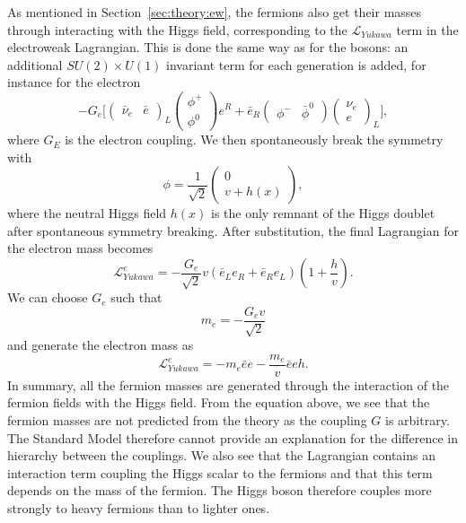 As mentioned in Section~\ref{sec:theory:ew}, the fermions also get their masses through interacting with the Higgs field, corresponding to the $\mathcal{L}_{Yukawa}$ term in the electroweak Lagrangian. This is done the same way as for the bosons: an additional $SU(2) \times U(1)$ invariant term for each generation is added, for instance for the electron
\begin{equation}
  -G_e \bigg[ \begin{pmatrix} \bar{\nu}_e & \bar{e}\end{pmatrix}_L   \begin{pmatrix} \phi^{+} \\ \phi^{0} \end{pmatrix} e^R +
  \bar{e}_R  \begin{pmatrix} \phi^{-} & \bar{\phi}^{0} \end{pmatrix}  \begin{pmatrix} \nu_e \\ e\end{pmatrix}_L  \bigg],
  \end{equation}
where $G_E$ is the electron coupling. We then spontaneously break the symmetry with
\begin{equation}
\phi = \frac{1}{\sqrt{2}}  \begin{pmatrix} 0 \\ v+h(x) \end{pmatrix},
\end{equation}
 where the neutral Higgs field $h(x)$ is the only remnant of the Higgs doublet after spontaneous symmetry breaking. After substitution, the final Lagrangian for the electron mass becomes
 \begin{equation}
   \mathcal{L}_{Yukawa}^e=-\frac{G_e}{\sqrt{2}}v(\bar{e}_L e_R + \bar{e}_R e_L )(1+\frac{h}{v}).
\end{equation}
We can choose $G_e$ such that
\begin{equation}
  m_e=-\frac{G_e v}{\sqrt{2}}
  \end{equation}
and generate the electron mass as
\begin{equation}
  \mathcal{L}_{Yukawa}^e=-m_e \bar{e}e-\frac{m_e}{v} \bar{e}eh.
\end{equation}  
In summary, all the fermion masses are generated through the interaction of the fermion fields with the Higgs field. From the equation above, we see that the fermion masses are not predicted from the theory as the coupling $G$ is arbitrary. The Standard Model therefore cannot provide an explanation for the difference in hierarchy between the couplings. We also see that the Lagrangian contains an interaction term coupling the Higgs scalar to the fermions and that this term depends on the mass of the fermion. The Higgs boson therefore couples more strongly to heavy fermions than to lighter ones.
     

